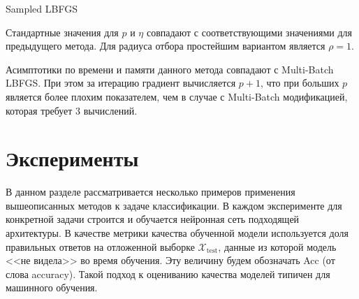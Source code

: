 \documentclass[preprint,12pt]{elsarticle}
\begin{document}
\begin{algorithm}[H]\label{sampledLBFGS}
\caption {Sampled LBFGS}
\SetAlgoLined
{}
\end{algorithm}

Стандартные значения для $p$ и $\eta$ совпадают с соответствующими значениями для предыдущего метода. Для радиуса отбора простейшим вариантом является $\rho = 1$.

Асимптотики по времени и памяти данного метода совпадают с Multi-Batch LBFGS. 
При этом за итерацию градиент вычисляется $p+1$, что при больших $p$ является более плохим показателем, чем в случае с Multi-Batch модификацией, которая требует $3$ вычислений.
\section{Эксперименты}
\label{S:3}
В данном разделе рассматривается несколько примеров применения вышеописанных методов к задаче классификации. В каждом эксперименте для конкретной задачи строится и обучается нейронная сеть подходящей архитектуры. В качестве метрики качества обученной модели используется доля правильных ответов на отложенной выборке $\mathcal{X}_\text{test}$, данные из которой модель <<не видела>> во время обучения. Эту величину будем обозначать Acc (от слова accuracy). Такой подход к оцениванию качества моделей типичен для машинного обучения.
\end{document}
